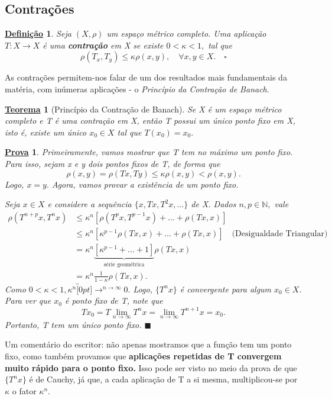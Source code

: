\documentclass{article}
\newtheorem*{def*}{\underline{Defini\c c\~ao}}
\newtheorem*{theorem*}{\underline{Teorema}}
\newtheorem*{proof*}{\underline{Prova}}
\renewcommand\qedsymbol{$\blacksquare$}
\begin{document}
\subsection{Contrações} 
\begin{def*}
  Seja \((X, \rho )\) um espaço métrico completo. Uma aplicação \(T:X\rightarrow X\) é uma \textbf{contração} em X se existe \(0 < \kappa < 1,\) tal que 
  \[
    \rho (T_{x}, T_{y})\leq \kappa \rho (x, y),\quad \forall x, y\in X.\quad\square
  \]
\end{def*}
  As contrações permitem-nos falar de um dos resultados mais fundamentais da matéria, com inúmeras aplicações - o \textit{Princípio da Contração de Banach}.
\hypertarget{banach_contraction}{\begin{theorem*}[Princípio da Contração de Banach]
  Se X é um espaço métrico completo e T é uma contração em X, então T possui um único ponto fixo em X, isto é, existe um único \(x_{0}\in X\) tal que \(T(x_{0}) = x_{0}.\)
\end{theorem*}}
\begin{proof*}
  Primeiramente, vamos mostrar que T tem no máximo um ponto fixo. Para isso, sejam x e y dois pontos fixos de T, de forma que 
  \[
    \rho (x, y) = \rho (Tx, Ty)\leq \kappa \rho (x, y) < \rho (x, y).
  \]
  Logo, \(x=y.\) Agora, vamos provar a existência de um ponto fixo. 

  Seja \(x\in X\) e considere a sequência \(\{x, Tx, T^{2}x, \dotsc\}\) de X. Dados \(n, p\in \mathbb{N},\) vale
 \begin{align*}
  \rho (T^{n+p}x, T^{n}x) &\leq \kappa^{n}[\rho (T^{p}x, T^{p-1}x) + \dotsc + \rho (Tx, x)]\\
                          &\leq \kappa^{n}[\kappa^{p-1}\rho (Tx, x) + \dotsc + \rho(Tx, x)]\quad \text{(Desigualdade Triangular)}\\
                          &= \kappa ^{n}\underbrace{[\kappa^{p-1} + \dotsc + 1]}_{\text{série geométrica}}\rho(Tx, x)\\
                          &= \kappa ^{n}\frac{1}{1-\kappa }\rho (Tx, x).
 \end{align*}
 Como \(0 < \kappa < 1, \kappa ^{n}\overbracket[0pt]{\longrightarrow}^{n\to \infty}0.\) Logo, \(\{T^{n}x\}\) é convergente para algum \(x_{0}\in X.\)
Para ver que \(x_{0}\) é ponto fixo de T, note que 
  \[
    Tx_{0} = T \lim_{n\to \infty}T^{n}x = \lim_{n\to \infty}T^{n+1}x = x_{0}.
  \]
  Portanto, T tem um único ponto fixo. \qedsymbol
\end{proof*}
  Um comentário do escritor: não apenas mostramos que a função tem um ponto fixo, como também provamos que \textbf{aplicações repetidas de T convergem muito rápido para o ponto fixo.}
Isso pode ser visto no meio da prova de que \(\{T^{n}x\}\) é de Cauchy, já que, a cada aplicação de T a si mesma, multiplicou-se por \(\kappa \) o fator \(\kappa^{n}.\)
\newpage
\end{document}
